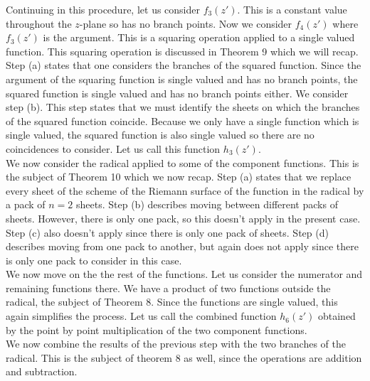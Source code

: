 Continuing in this procedure, let us consider $f_{3}\left(z'\right)$.  This is a constant value throughout the $z$-plane so has no branch points.  Now we consider $f_{4}\left(z'\right)$ where $f_{3}\left(z'\right)$ is the argument.  This is a squaring operation applied to a single valued function.  This squaring operation is discussed in Theorem 9 which we will recap.\\

Step (a) states that one considers the branches of the squared function.  Since the argument of the squaring function is single valued and has no branch points, the squared function is single valued and has no branch points either.  We consider step (b).  This step states that we must identify the sheets on which the branches of the squared function coincide.  Because we only have a single function which is single valued, the squared function is also single valued so there are no coincidences to consider.  Let us call this function $h_{3}\left(z' \right)$.\\

We now consider the radical applied to some of the component functions.  This is the subject of Theorem 10 which we now recap.  Step (a) states that we replace every sheet of the scheme of the Riemann surface of the function in the radical by a pack of $n=2$ sheets.  Step (b) describes moving between different packs of sheets.  However, there is only one pack, so this doesn't apply in the present case.  Step (c) also doesn't apply since there is only one pack of sheets.  Step (d) describes moving from one pack to another, but again does not apply since there is only one pack to consider in this case.\\

We now move on the the rest of the functions.  Let us consider the numerator and remaining functions there.  We have a product of two functions outside the radical, the subject of Theorem 8.  Since the functions are single valued, this again simplifies the process.  Let us call the combined function $h_{6}\left(z'\right)$ obtained by the point by point multiplication of the two component functions.\\

We now combine the results of the previous step with the two branches of the radical.  This is the subject of theorem 8 as well, since the operations are addition and subtraction. 



